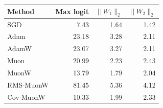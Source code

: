 \footnotesize
\begin{tabular}{lrrr}
\toprule
Method & Max logit & $\|W_1\|_2$ & $\|W_2\|_2$ \\
\midrule
SGD & 7.43 & 1.64 & 1.42 \\
Adam & 23.18 & 3.28 & 2.11 \\
AdamW & 23.07 & 3.27 & 2.11 \\
Muon & 20.99 & 2.23 & 2.43 \\
MuonW & 13.79 & 1.79 & 2.04 \\
RMS-MuonW & 81.45 & 5.36 & 4.12 \\
Cov-MuonW & 10.33 & 1.99 & 2.33 \\
\bottomrule
\end{tabular}
